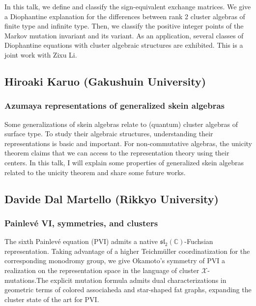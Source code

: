 \documentclass[
]{article}
\begin{document}
In this talk, we define and classify the sign-equivalent exchange
matrices. We give a Diophantine explanation for the differences between
rank 2 cluster algebras of finite type and infinite type. Then, we
classify the positive integer points of the Markov mutation invariant
and its variant. As an application, several classes of Diophantine
equations with cluster algebraic structures are exhibited. This is a
joint work with Zixu Li.

\subsection*{Hiroaki Karuo (Gakushuin
University)}\label{hiroaki-karuo-gakushuin-university}

\subsubsection*{Azumaya representations of generalized skein
algebras}\label{azumaya-representations-of-generalized-skein-algebras}

Some generalizations of skein algebras relate to (quantum) cluster
algebras of surface type. To study their algebraic structures,
understanding their representations is basic and important. For
non-commutative algebras, the unicity theorem claims that we can access
to the representation theory using their centers. In this talk, I will
explain some properties of generalized skein algebras related to the
unicity theorem and share some future works.

\subsection*{Davide Dal Martello (Rikkyo
University)}\label{davide-dal-martello-rikkyo-university}

\subsubsection*{Painlevé VI, symmetries, and
clusters}\label{painlevuxe9-vi-symmetries-and-clusters}

The sixth Painlevé equation (PVI) admits a native
\(\mathfrak{sl}_{2}(\mathbb{C})\)-Fuchsian representation. Taking
advantage of a higher Teichmüller coordinatization for the corresponding
monodromy group, we give Okamoto's symmetry of PVI a realization on the
representation space in the language of cluster
\(\mathcal{X}\)-mutations.The explicit mutation formula admits dual
characterizations in geometric terms of colored associaheda and
star-shaped fat graphs, expanding the cluster state of the art for PVI.
\end{document}
